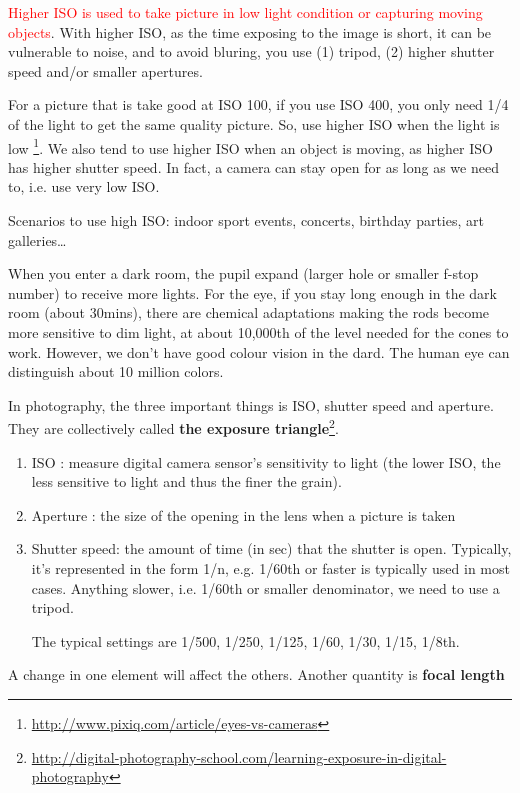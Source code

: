 \begin{framed}

\textcolor{red}{Higher ISO is used to take picture in low light condition or
capturing moving objects}. With higher ISO, as the time exposing to the image is
short, it can be vulnerable to noise, and to avoid bluring, you use (1) tripod,
(2) higher shutter speed and/or smaller apertures.

For a picture that is take good at ISO 100, if you use ISO 400, you only need
1/4 of the light to get the same quality picture. So, use higher ISO when the
light is low \footnote{\url{http://www.pixiq.com/article/eyes-vs-cameras}}. We
also tend to use higher ISO when an object is moving, as higher ISO has higher
shutter speed. In fact, a camera can stay open for as long as we need to, i.e.
use very low ISO.

Scenarios to use high ISO: indoor sport events, concerts, birthday parties, art
galleries\ldots
\end{framed}

When you enter a dark room, the pupil expand (larger hole or smaller f-stop
number) to receive more lights. For the eye, if you stay long enough in the dark
room (about 30mins), there are chemical adaptations making the rods become more
sensitive to dim light, at about 10,000th of the level needed for the cones to
work. However, we don't have good colour vision in the dard. The human eye can
distinguish about 10 million colors. 

\begin{framed}
In photography, the three important things is ISO, shutter speed and aperture.
They are collectively called {\bf the exposure
triangle}\footnote{\url{http://digital-photography-school.com/learning-exposure-in-digital-photography}}.
\begin{enumerate}
  \item ISO : measure digital camera sensor's sensitivity to light (the lower
  ISO, the less sensitive to light and thus the finer the grain).
  \item Aperture : the size of the opening in the lens when a picture is taken
  \item Shutter speed: the amount of time (in sec) that the shutter is open.
  Typically, it's represented in the form 1/n, e.g. 1/60th or faster is
  typically used in most cases. Anything slower, i.e. 1/60th or smaller
  denominator, we need to use a tripod. 
  
  The typical settings are 1/500, 1/250, 1/125, 1/60, 1/30, 1/15, 1/8th.   
\end{enumerate}
A change in one element will affect the others. Another quantity is {\bf focal
length} 
\end{framed}

